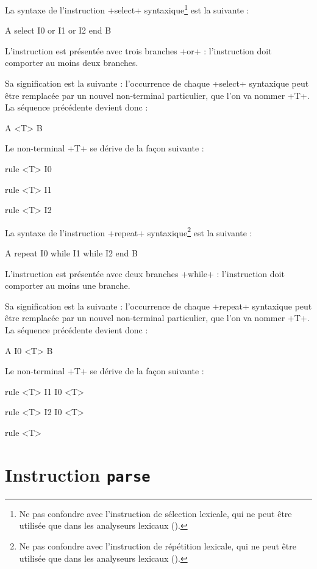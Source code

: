
La syntaxe de l'instruction \ggs+select+ syntaxique\footnote{Ne pas confondre avec l'instruction de sélection lexicale, qui ne peut être utilisée que dans les analyseurs lexicaux ().} est la suivante :
\begin{galgas}
A
select
  I0
or
  I1
or
  I2
end
B
\end{galgas}

L'instruction est présentée avec trois branches \ggs+or+ : l'instruction doit comporter au moins deux branches.

Sa signification est la suivante : l'occurrence de chaque \ggs+select+ syntaxique peut être remplacée par un nouvel non-terminal particulier, que l'on va nommer \ggs+T+. La séquence précédente devient donc :
\begin{galgas}
A
<T>
B
\end{galgas}

Le non-terminal \ggs+T+ se dérive de la façon suivante :
\begin{galgas}
rule <T> { I0 }

rule <T> { I1 }

rule <T> { I2 }
\end{galgas}








La syntaxe de l'instruction \ggs+repeat+ syntaxique\footnote{Ne pas confondre avec l'instruction de répétition lexicale, qui ne peut être utilisée que dans les analyseurs lexicaux ().} est la suivante :
\begin{galgas}
A
repeat
  I0
while
  I1
while
  I2
end
B
\end{galgas}

L'instruction est présentée avec deux branches \ggs+while+ : l'instruction doit comporter au moins une branche.

Sa signification est la suivante : l'occurrence de chaque \ggs+repeat+ syntaxique peut être remplacée par un nouvel non-terminal particulier, que l'on va nommer \ggs+T+. La séquence précédente devient donc :
\begin{galgas}
A
I0
<T>
B
\end{galgas}

Le non-terminal \ggs+T+ se dérive de la façon suivante :
\begin{galgas}
rule <T> { I1 I0 <T> }

rule <T> { I2 I0 <T> }

rule <T> {  }
\end{galgas}







\section{Instruction \texttt{parse}}











